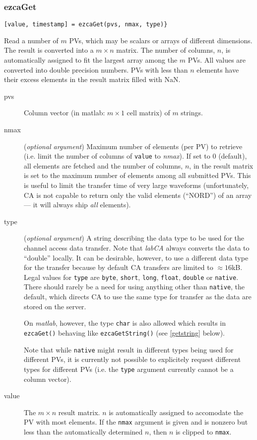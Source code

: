 \documentclass{article}
\newcommand{\sca}{{\em labCA}}
\newcommand{\matlab}{{\em matlab}}
\newcommand{\com}[1]{{\tt #1}}
\newcommand{\NAN}{\mbox{NaN}}
\newcommand{\PVITEM}{
\item[pvs] Column vector (in matlab: $m\times 1$ cell matrix)
of $m$ strings.
}
\begin{document}
\subsubsection{ezcaGet}
\label{ezcaget}
\begin{verbatim}
[value, timestamp] = ezcaGet(pvs, nmax, type)}
\end{verbatim}
Read a number of $m$ PVs, which may be scalars or arrays of
different dimensions. The result is converted into a $m\times n$
matrix. The number of columns, $n$, is automatically assigned
to fit the largest array among the $m$ PVs. All values are
converted into double precision numbers. PVs with less than
$n$ elements have their excess elements in the result matrix
filled with \NAN.
\begin{description}
\PVITEM
%
%
\item[nmax] ({\em optional argument}) Maximum number of elements
(per PV) to retrieve (i.e. limit the number of columns of \com{value} to
{\em nmax}).
If set to 0 (default), all elements are fetched
and the number of columns, $n$, in the result matrix is set to the
maximum number of elements among all submitted PVs. This is useful
to limit the transfer time of very large waveforms (unfortunately,
CA is not capable to return only the valid elements (``NORD'') of
an array --- it will always ship {\em all} elements).
%
%
\item[type] ({\em optional argument}) A string describing the
data type to be used for the channel access data transfer. Note
that \sca{} always converts the data to ``double'' locally. It
can be desirable, however, to use a different data type for the
transfer because by default CA transfers are limited to $\approx 16$kB.
Legal values for \com{type}{} are \com{byte}, \com{short}, \com{long},
\com{float}, \com{double} or \com{native}. There should rarely
be a need for using anything other than \com{native}, the default,
which directs CA to use the same type for transfer as the data are
stored on the server.

On \matlab{}{}, however, the type \com{char}{} is also allowed which
results in \com{ezcaGet()}{} behaving like \com{ezcaGetString()}{}
(see \ref{getstring} below).

Note that while \com{native}{} might result in different types
being used for different PVs, it is currently not possible to
explicitely request different types for different PVs (i.e. the
\com{type}{} argument currently cannot be a column vector).
%
%
\item[value] The $m\times n$ result matrix. $n$ is automatically
assigned to accomodate the PV with most elements. If the \com{nmax}{}
argument is given and is nonzero but less than the automatically
determined $n$, then $n$ is clipped to \com{nmax}.


\end{description}
\end{document}
